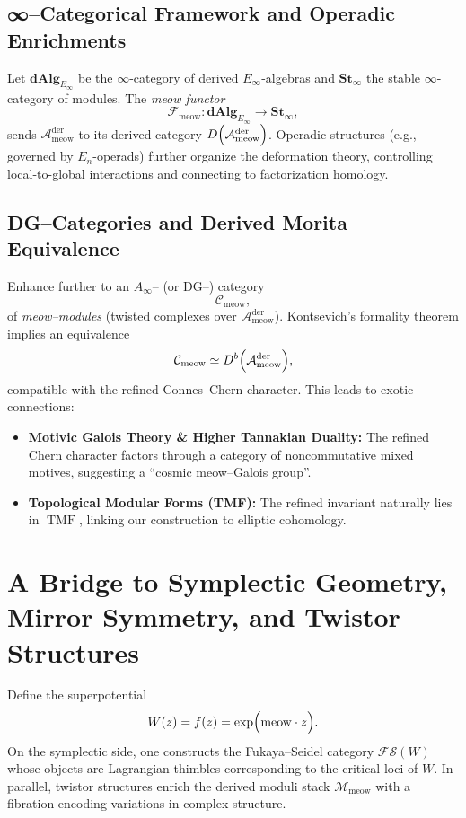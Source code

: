\documentclass[11pt,a4paper]{article}
\newcommand{\meow}{\mathrm{meow}}
\newcommand{\Mmeow}{\mathcal{M}_{\meow}}
\newcommand{\Ameow}{\mathcal{A}_{\meow}}
\newcommand{\Cmeow}{\mathcal{C}_{\meow}}
\newcommand{\TMF}{\operatorname{TMF}}
\theoremstyle{plain}
\theoremstyle{definition}
\theoremstyle{remark}
\begin{document}
\subsection{∞--Categorical Framework and Operadic Enrichments}
Let \(\mathbf{dAlg}_{E_\infty}\) be the \(\infty\)-category of derived \(E_\infty\)-algebras and \(\mathbf{St}_\infty\) the stable \(\infty\)-category of modules. The \emph{meow functor}
\[
    \mathcal{F}_{\meow}\colon \mathbf{dAlg}_{E_\infty} \longrightarrow \mathbf{St}_\infty,
\]
sends \(\Ameow^{\mathrm{der}}\) to its derived category \(D\Bigl(\Ameow^{\mathrm{der}}\Bigr)\). Operadic structures (e.g., governed by \(E_n\)-operads) further organize the deformation theory, controlling local-to-global interactions and connecting to factorization homology.

\subsection{DG--Categories and Derived Morita Equivalence}
Enhance further to an \(A_\infty\)– (or DG–) category
\[
    \Cmeow,
\]
of \emph{meow--modules} (twisted complexes over \(\Ameow^{\mathrm{der}}\)). Kontsevich’s formality theorem implies an equivalence
\[
    \Cmeow \simeq D^b\Bigl(\Ameow^{\mathrm{der}}\Bigr),
\]
compatible with the refined Connes--Chern character. This leads to exotic connections:
\begin{itemize}
    \item \textbf{Motivic Galois Theory \& Higher Tannakian Duality:} The refined Chern character factors through a category of noncommutative mixed motives, suggesting a ``cosmic meow--Galois group''.
    \item \textbf{Topological Modular Forms (TMF):} The refined invariant naturally lies in \(\TMF\), linking our construction to elliptic cohomology.
\end{itemize}

\section{A Bridge to Symplectic Geometry, Mirror Symmetry, and Twistor Structures}
Define the superpotential
\[
    W(z)=f(z)=\exp\Bigl(\meow\cdot z\Bigr).
\]
On the symplectic side, one constructs the Fukaya--Seidel category \(\mathcal{FS}(W)\) whose objects are Lagrangian thimbles corresponding to the critical loci of \(W\). In parallel, twistor structures enrich the derived moduli stack \(\Mmeow\) with a fibration encoding variations in complex structure.
\end{document}

